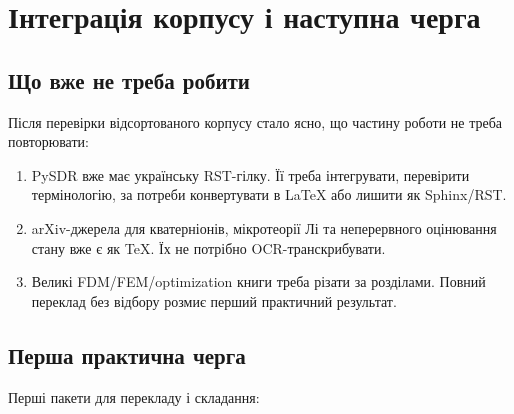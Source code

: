 \chapter{Інтеграція корпусу і наступна черга}

\section{Що вже не треба робити}

Після перевірки відсортованого корпусу стало ясно, що частину роботи не треба повторювати:

\begin{enumerate}[label=\arabic*.]
  \item PySDR вже має українську RST-гілку. Її треба інтегрувати, перевірити термінологію, за потреби конвертувати в LaTeX або лишити як Sphinx/RST.
  \item arXiv-джерела для кватерніонів, мікротеорії Лі та неперервного оцінювання стану вже є як TeX. Їх не потрібно OCR-транскрибувати.
  \item Великі FDM/FEM/optimization книги треба різати за розділами. Повний переклад без відбору розмиє перший практичний результат.
\end{enumerate}

\section{Перша практична черга}

Перші пакети для перекладу і складання:

